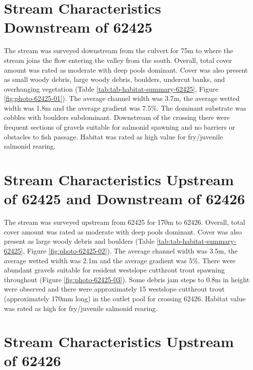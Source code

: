 \documentclass[
]{book}
\begin{document}
\hypertarget{stream-characteristics-downstream-of-62425}{%
\section*{Stream Characteristics Downstream of 62425}\label{stream-characteristics-downstream-of-62425}}

The stream was surveyed downstream from the culvert for 75m to where the stream joins the flow entering the valley from the south. Overall, total cover amount was rated as moderate with deep pools dominant. Cover was also present as small woody debris, large woody debris, boulders, undercut banks, and overhanging vegetation (Table \ref{tab:tab-habitat-summary-62425}, Figure \ref{fig:photo-62425-01}). The average channel width was 3.7m, the average wetted width was 1.8m and the average gradient was 7.5\%. The dominant substrate was cobbles with boulders subdominant. Downstream of the crossing there were frequent sections of gravels suitable for salmonid spawning and no barriers or obstacles to fish passage. Habitat was rated as high value for fry/juvenile salmonid rearing.

\hypertarget{stream-characteristics-upstream-of-62425-and-downstream-of-62426}{%
\section*{Stream Characteristics Upstream of 62425 and Downstream of 62426}\label{stream-characteristics-upstream-of-62425-and-downstream-of-62426}}

The stream was surveyed upstream from 62425 for 170m to 62426. Overall, total cover amount was rated as moderate with deep pools dominant. Cover was also present as large woody debris and boulders (Table \ref{tab:tab-habitat-summary-62425}, Figure \ref{fig:photo-62425-02}). The average channel width was 3.5m, the average wetted width was 2.1m and the average gradient was 5\%. There were abundant gravels suitable for resident westslope cutthrout trout spawning throughout (Figure \ref{fig:photo-62425-03}). Some debris jam steps to 0.8m in height were observed and there were approximately 15 westslope cutthrout trout (approximately 170mm long) in the outlet pool for crossing 62426. Habitat value was rated as high for fry/juvenile salmonid rearing.

\hypertarget{stream-characteristics-upstream-of-62426}{%
\section*{Stream Characteristics Upstream of 62426}\label{stream-characteristics-upstream-of-62426}}
\end{document}

